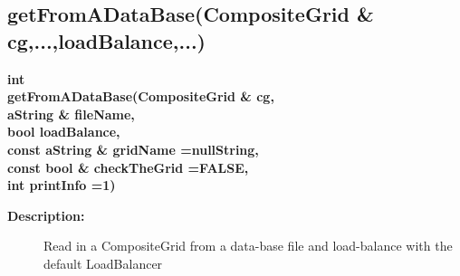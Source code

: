\subsection{getFromADataBase(CompositeGrid \& cg,...,loadBalance,...)}
 
\newlength{\DataBaseAccessFunctionsIncludeArgIndent}
\begin{flushleft} \textbf{%
int  \\ 
\settowidth{\DataBaseAccessFunctionsIncludeArgIndent}{getFromADataBase(}%
getFromADataBase(CompositeGrid \& cg, \\ 
\hspace{\DataBaseAccessFunctionsIncludeArgIndent}aString \& fileName, \\ 
\hspace{\DataBaseAccessFunctionsIncludeArgIndent}bool loadBalance, \\ 
\hspace{\DataBaseAccessFunctionsIncludeArgIndent}const aString \& gridName  =nullString,\\ 
\hspace{\DataBaseAccessFunctionsIncludeArgIndent}const bool \& checkTheGrid  =FALSE,\\ 
\hspace{\DataBaseAccessFunctionsIncludeArgIndent}int printInfo  =1)
}\end{flushleft}
\begin{description}
\item[{\bf Description:}] 
   Read in a CompositeGrid from a data-base file and load-balance with the default LoadBalancer
\end{description}
